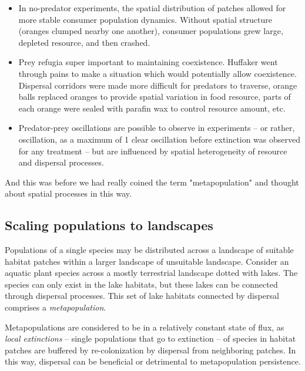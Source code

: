 \documentclass[12pt]{article}
\begin{document}
\begin{itemize}

  \item In no-predator experiments, the spatial distribution of patches allowed for more stable consumer population dynamics. Without spatial structure (oranges clumped nearby one another), consumer populations grew large, depleted resource, and then crashed.

  \item Prey refugia super important to maintaining coexistence. Huffaker went through pains to make a situation which would potentially allow coexistence. Dispersal corridors were made more difficult for predators to traverse, orange balls replaced oranges to provide spatial variation in food resource, parts of each orange were sealed with parafin wax to control resource amount, etc. 

  \item Predator-prey oscillations are possible to observe in experiments -- or rather, oscillation, as a maximum of 1 clear oscillation before extinction was observed for any treatment -- but are influenced by spatial heterogeneity of resource and dispersal processes.

\end{itemize}


And this was before we had really coined the term "metapopulation" and thought about spatial processes in this way. 













\bigskip

\subsection*{Scaling populations to landscapes}

Populations of a single species may be distributed across a landscape of suitable habitat patches within a larger landscape of unsuitable landscape. Consider an aquatic plant species across a mostly terrestrial landscape dotted with lakes. The species can only exist in the lake habitats, but these lakes can be connected through dispersal processes. This set of lake habitats connected by dispersal comprises a \textit{metapopulation}. 

Metapopulations are considered to be in a relatively constant state of flux, as \textit{local extinctions} -- single populations that go to extinction -- of species in habitat patches are buffered by re-colonization by dispersal from neighboring patches. In this way, dispersal can be beneficial or detrimental to metapopulation persistence. 
\end{document}
